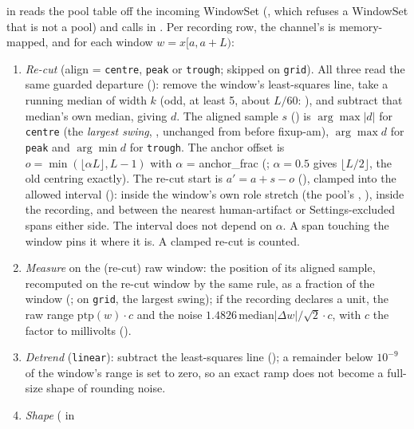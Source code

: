  in  reads the pool table off the
incoming WindowSet (, which refuses a WindowSet that is not a pool) and calls
 in . Per recording row, the channel's
 is memory-mapped, and for each window $w = x[a, a+L)$:
\begin{enumerate}
\item \emph{Re-cut} (align = \texttt{centre}, \texttt{peak} or \texttt{trough}; skipped on
  \texttt{grid}). All three read the same guarded departure (): remove
  the window's least-squares line, take a running median of width $k$ (odd, at least 5, about
  $L/60$: ), and subtract that median's own median, giving $d$. The aligned
  sample $s$ () is $\arg\max|d|$ for \texttt{centre} (the \emph{largest
  swing}, , unchanged from before fixup-am), $\arg\max d$ for \texttt{peak}
  and $\arg\min d$ for \texttt{trough}. The anchor offset is
  $o = \min(\lfloor \alpha L\rfloor, L-1)$ with $\alpha$ = anchor\_frac (;
  $\alpha = 0.5$ gives $\lfloor L/2\rfloor$, the old centring exactly). The re-cut start is
  $a' = a + s - o$ (), clamped into the allowed interval
  (): inside the window's own role stretch (the pool's
  , ), inside the recording, and between the nearest
  human-artifact or Settings-excluded spans either side. The interval does not depend on
  $\alpha$. A span touching the window pins it where it is. A clamped re-cut is counted.
\item \emph{Measure} on the (re-cut) raw window: the position of its aligned sample, recomputed
  on the re-cut window by the same rule, as a fraction of the window (; on
  \texttt{grid}, the largest swing); if the recording declares a unit, the raw range
  $\mathrm{ptp}(w)\cdot c$ and the noise $1.4826\,\mathrm{median}|\Delta w|/\sqrt2\cdot c$,
  with $c$ the factor to millivolts ().
\item \emph{Detrend} (\texttt{linear}): subtract the least-squares line ();
  a remainder below $10^{-9}$ of the window's range is set to zero, so an exact ramp does not
  become a full-size shape of rounding noise.
\item \emph{Shape} ( in

\end{enumerate}
